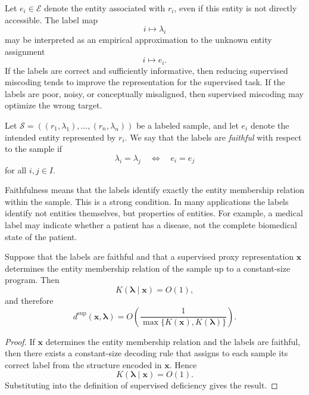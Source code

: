 Let \(e_i\in \mathcal E\) denote the entity associated with \(r_i\), even if this entity is not directly accessible. The label map
\[
    i \mapsto \lambda_i
\]
may be interpreted as an empirical approximation to the unknown entity assignment
\[
    i \mapsto e_i.
\]
If the labels are correct and sufficiently informative, then reducing supervised miscoding tends to improve the representation for the supervised task. If the labels are poor, noisy, or conceptually misaligned, then supervised miscoding may optimize the wrong target.

\begin{definition}
\label{def:label_faithfulness}
Let \(\mathcal S=((r_1,\lambda_1),\ldots,(r_n,\lambda_n))\) be a labeled sample, and let \(e_i\) denote the intended entity represented by \(r_i\). We say that the labels are \emph{faithful} with respect to the sample if
\[
    \lambda_i=\lambda_j
    \quad\Longleftrightarrow\quad
    e_i=e_j
\]
for all \(i,j\in I\).
\end{definition}

Faithfulness means that the labels identify exactly the entity membership relation within the sample. This is a strong condition. In many applications the labels identify not entities themselves, but properties of entities. For example, a medical label may indicate whether a patient has a disease, not the complete biomedical state of the patient.

\begin{proposition}
\label{prop:faithful_labels_zero_deficiency}
Suppose that the labels are faithful and that a supervised proxy representation \(\mathbf{x}\) determines the entity membership relation of the sample up to a constant-size program. Then
\[
    K(\boldsymbol{\lambda}\mid \mathbf{x})=O(1),
\]
and therefore
\[
    d^{\mathrm{sup}}(\mathbf{x},\boldsymbol{\lambda})
    =
    O\left(
        \frac{1}
        {\max\{K(\mathbf{x}),K(\boldsymbol{\lambda})\}}
    \right).
\]
\end{proposition}

\begin{proof}
If \(\mathbf{x}\) determines the entity membership relation and the labels are faithful, then there exists a constant-size decoding rule that assigns to each sample its correct label from the structure encoded in \(\mathbf{x}\). Hence
\[
    K(\boldsymbol{\lambda}\mid \mathbf{x})=O(1).
\]
Substituting into the definition of supervised deficiency gives the result.
\end{proof}

